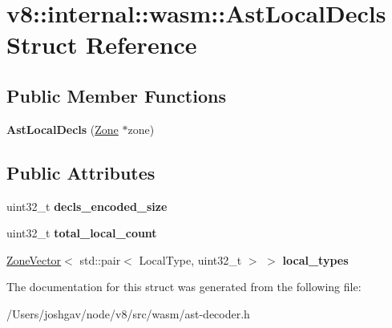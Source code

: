 \hypertarget{structv8_1_1internal_1_1wasm_1_1_ast_local_decls}{}\section{v8\+:\+:internal\+:\+:wasm\+:\+:Ast\+Local\+Decls Struct Reference}
\label{structv8_1_1internal_1_1wasm_1_1_ast_local_decls}
\subsection*{Public Member Functions}
\begin{DoxyCompactItemize}
\item 
{\bfseries Ast\+Local\+Decls} (\hyperlink{classv8_1_1internal_1_1_zone}{Zone} $\ast$zone)\hypertarget{structv8_1_1internal_1_1wasm_1_1_ast_local_decls_a095fa5bbbfcdadcc3811298a98abbb62}{}\label{structv8_1_1internal_1_1wasm_1_1_ast_local_decls_a095fa5bbbfcdadcc3811298a98abbb62}

\end{DoxyCompactItemize}
\subsection*{Public Attributes}
\begin{DoxyCompactItemize}
\item 
uint32\+\_\+t {\bfseries decls\+\_\+encoded\+\_\+size}\hypertarget{structv8_1_1internal_1_1wasm_1_1_ast_local_decls_a2e72b03d426b2b89f810a3badefef1e2}{}\label{structv8_1_1internal_1_1wasm_1_1_ast_local_decls_a2e72b03d426b2b89f810a3badefef1e2}

\item 
uint32\+\_\+t {\bfseries total\+\_\+local\+\_\+count}\hypertarget{structv8_1_1internal_1_1wasm_1_1_ast_local_decls_a0ce465257da2e423b1169b98552bf607}{}\label{structv8_1_1internal_1_1wasm_1_1_ast_local_decls_a0ce465257da2e423b1169b98552bf607}

\item 
\hyperlink{classv8_1_1internal_1_1_zone_vector}{Zone\+Vector}$<$ std\+::pair$<$ Local\+Type, uint32\+\_\+t $>$ $>$ {\bfseries local\+\_\+types}\hypertarget{structv8_1_1internal_1_1wasm_1_1_ast_local_decls_ae959a87751488a1d774758a5e133668c}{}\label{structv8_1_1internal_1_1wasm_1_1_ast_local_decls_ae959a87751488a1d774758a5e133668c}

\end{DoxyCompactItemize}


The documentation for this struct was generated from the following file\+:\begin{DoxyCompactItemize}
\item 
/\+Users/joshgav/node/v8/src/wasm/ast-\/decoder.\+h\end{DoxyCompactItemize}
